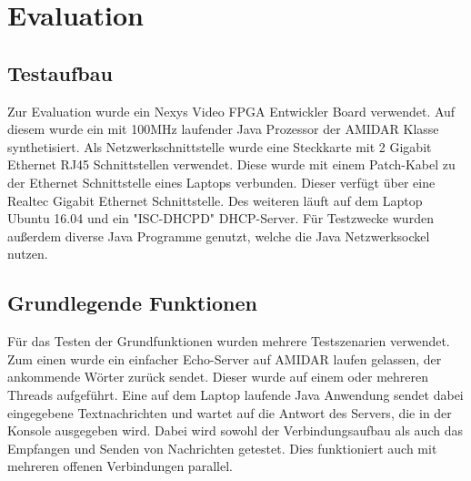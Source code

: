 \chapter{Evaluation}


\section{Testaufbau}

Zur Evaluation wurde ein Nexys Video FPGA Entwickler Board verwendet. Auf diesem wurde ein mit 100MHz laufender Java Prozessor der AMIDAR Klasse synthetisiert. Als Netzwerkschnittstelle wurde eine Steckkarte mit 2 Gigabit Ethernet RJ45 Schnittstellen verwendet. Diese wurde mit einem Patch-Kabel zu der Ethernet Schnittstelle eines Laptops verbunden. Dieser verfügt über eine Realtec Gigabit Ethernet Schnittstelle. Des weiteren läuft auf dem Laptop Ubuntu 16.04 und ein "{}ISC-DHCPD"{} DHCP-Server. Für Testzwecke wurden außerdem diverse Java Programme genutzt, welche die Java Netzwerksockel nutzen. 

\section{Grundlegende Funktionen}

Für das Testen der Grundfunktionen wurden mehrere Testszenarien verwendet. Zum einen wurde ein einfacher Echo-Server auf AMIDAR laufen gelassen, der ankommende Wörter zurück sendet. Dieser wurde auf einem oder mehreren Threads aufgeführt. Eine auf dem Laptop laufende Java Anwendung sendet dabei eingegebene Textnachrichten und wartet auf die Antwort des Servers, die in der Konsole ausgegeben wird. Dabei wird sowohl der Verbindungsaufbau als auch das Empfangen und Senden von Nachrichten getestet. Dies funktioniert auch mit mehreren offenen Verbindungen parallel. 



